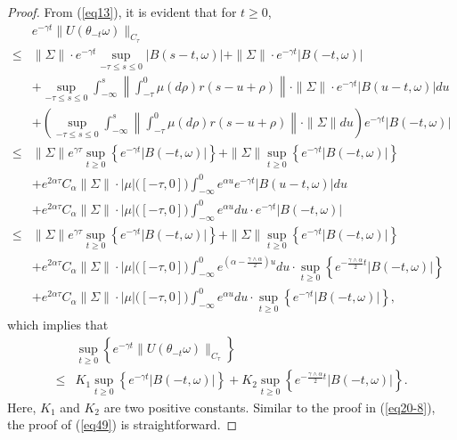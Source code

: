\documentclass[preprint,12pt]{elsarticle}
\begin{document}
\begin{proof}From (\ref{eq13}), it is evident that for $t\geq0$,
\begin{align}\label{eq50}
&e^{-\gamma t}\|U(\theta_{-t}\omega)\|_{C_\tau}\nonumber\\
\leq&\|\Sigma\|\cdot e^{-\gamma t}\sup_{-\tau\leq s\leq0}|B(s-t,\omega)|+\|\Sigma\|\cdot e^{-\gamma t}|B(-t,\omega)|\nonumber\\
&+\sup_{-\tau\leq s\leq0}\int_{-\infty}^{s}\left\|\int_{-\tau}^0\mu(d\rho)r(s-u+\rho)\right\|\cdot\|\Sigma\|\cdot e^{-\gamma t}|B(u-t,\omega)|du\nonumber\\
&+\left(\sup_{-\tau\leq s\leq0}\int_{-\infty}^{s}\left\|\int_{-\tau}^0\mu(d\rho)r(s-u+\rho)\right\|\cdot\|\Sigma\|du\right)e^{-\gamma t}|B(-t,\omega)|\nonumber\\
\leq&\|\Sigma\|e^{\gamma\tau}\sup_{t\geq0}\left\{e^{-\gamma t}|B(-t,\omega)|\right\}+\|\Sigma\|\sup_{t\geq0}\left\{e^{-\gamma t}|B(-t,\omega)|\right\}\nonumber\\
&+e^{2\alpha\tau}C_\alpha\|\Sigma\|\cdot|\mu|\bigl([-\tau,0]\bigr)\int_{-\infty}^{0}e^{\alpha u}e^{-\gamma t}|B(u-t,\omega)|du\nonumber\\
&+e^{2\alpha\tau}C_\alpha\|\Sigma\|\cdot|\mu|\bigl([-\tau,0]\bigr)\int_{-\infty}^{0}e^{\alpha u}du\cdot e^{-\gamma t}|B(-t,\omega)|\nonumber\\
\leq&\|\Sigma\|e^{\gamma\tau}\sup_{t\geq0}\left\{e^{-\gamma t}|B(-t,\omega)|\right\}+\|\Sigma\|\sup_{t\geq0}\left\{e^{-\gamma t}|B(-t,\omega)|\right\}\nonumber\\
&+e^{2\alpha\tau}C_\alpha\|\Sigma\|\cdot|\mu|\bigl([-\tau,0]\bigr)\int_{-\infty}^{0}e^{(\alpha-\frac{\gamma\wedge\alpha}{2})u}du\cdot\sup_{t\geq0}\left\{e^{-\frac{\gamma\wedge\alpha}{2} t}|B(-t,\omega)|\right\}\nonumber\\
&+e^{2\alpha\tau}C_\alpha\|\Sigma\|\cdot|\mu|\bigl([-\tau,0]\bigr)\int_{-\infty}^{0}e^{\alpha u}du\cdot\sup_{t\geq0}\left\{e^{-\gamma t}|B(-t,\omega)|\right\},
\end{align}
which implies that
\begin{align}\label{eq51}
&\sup_{t\geq0}\left\{e^{-\gamma t}\|U(\theta_{-t}\omega)\|_{C_\tau}\right\}\nonumber\\
\leq&K_1\sup_{t\geq0}\left\{e^{-\gamma t}|B(-t,\omega)|\right\}+K_2\sup_{t\geq0}\left\{e^{-\frac{\gamma\wedge\alpha}{2} t}|B(-t,\omega)|\right\}.
\end{align}
Here, $K_1$ and $K_2$ are two positive constants. Similar to the proof in (\ref{eq20-8}), the proof of (\ref{eq49}) is straightforward.
\end{proof}
\end{document}

